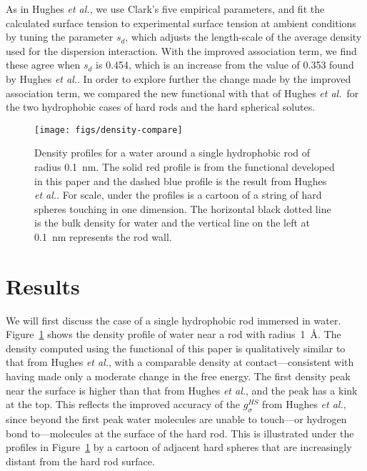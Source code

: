 \documentclass[twocolumn,amsmath,amssymb,prl]{revtex4-1}
\newcommand\lscale{\ensuremath{s_d}}
\newcommand\hughesetal{Hughes \emph{et al.}}
\begin{document}
As in \hughesetal, we use Clark's five empirical parameters, and fit
the calculated surface tension to experimental surface tension at
ambient conditions by tuning the parameter $\lscale$, which adjusts
the length-scale of the average density used for the dispersion
interaction.  With the improved association term, we find these agree
when $\lscale$ is 0.454, which is an increase from the value of 0.353
found by \hughesetal.  In order to explore further the change made by
the improved association term, we compared the new functional with
that of \hughesetal\ for the two hydrophobic cases of hard rods and
the hard spherical solutes.

\begin{figure}
\begin{center}
\texttt{[image: figs/density-compare]}
\end{center}
\caption{ Density profiles for a water around a single hydrophobic rod
  of radius 0.1~nm. The solid red profile is from the functional
  developed in this paper and the dashed blue profile is the result
  from \hughesetal.  For scale, under the profiles
  is a cartoon of a string of hard spheres touching in one
  dimension. The horizontal black dotted line is the bulk density for
  water and the vertical line on the left at 0.1~nm represents the
  rod wall.}
\label{fig:density-single-rod}
\end{figure}

\section{Results}

We will first discuss the case of a single hydrophobic rod immersed in
water. Figure~\ref{fig:density-single-rod} shows the density profile
of water near a rod with radius~1~\AA.  The density computed using the
functional of this paper is qualitatively similar to that from
\hughesetal, with a comparable density at contact---consistent with
having made only a moderate change in the free energy.  The first
density peak near the surface is higher than that from \hughesetal,
and the peak has a kink at the top.  This reflects the improved
accuracy of the $g_\sigma^\textit{HS}$ from \hughesetal, since beyond
the first peak water molecules are unable to touch---or hydrogen bond
to---molecules at the surface of the hard rod. This is illustrated
under the profiles in Figure~\ref{fig:density-single-rod} by a cartoon
of adjacent hard spheres that are increasingly distant from the hard
rod surface.
\end{document}

